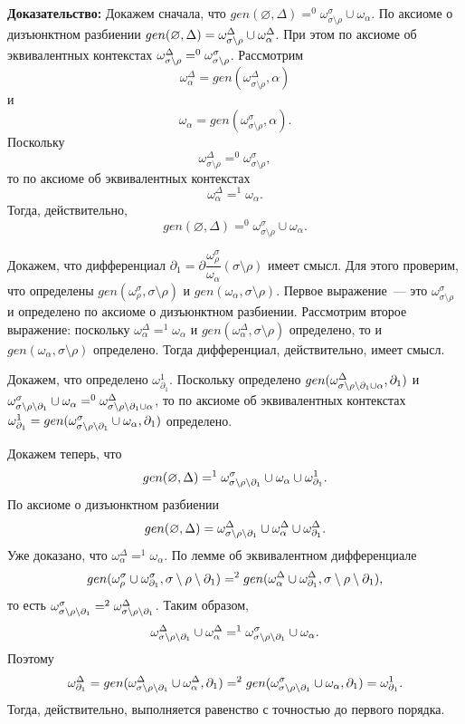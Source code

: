 \textbf{Доказательство:}
Докажем сначала, что $gen(\varnothing, \Delta) =^0 \omega^\sigma_{\sigma\setminus\rho} \cup \omega_\alpha$. По аксиоме о дизъюнктном разбиении $gen(\varnothing, \Delta) = \omega^\Delta_{\sigma\setminus\rho} \cup \omega^\Delta_\alpha$. При этом по аксиоме об эквивалентных контекстах $\omega^\Delta_{\sigma\setminus\rho} =^0 \omega^\sigma_{\sigma\setminus\rho}$. Рассмотрим $$\omega^\Delta_\alpha = gen(\omega^\Delta_{\sigma\setminus\rho}, \alpha)$$ 
и $$\omega_\alpha = gen(\omega^\sigma_{\sigma\setminus\rho}, \alpha).$$ 
Поскольку $$\omega^\Delta_{\sigma\setminus\rho} =^0 \omega^\sigma_{\sigma\setminus\rho},$$ 
то по аксиоме об эквивалентных контекстах $$\omega^\Delta_\alpha =^1 \omega_\alpha.$$ Тогда, действительно, $$gen(\varnothing, \Delta) =^0 \omega^\sigma_{\sigma\setminus\rho} \cup \omega_\alpha.$$ 

Докажем, что дифференциал $\partial_1 = \partial\dfrac{\omega^\sigma_\rho}{\omega_\alpha}(\sigma\setminus\rho)$ имеет смысл. Для этого проверим, что определены $gen(\omega^\sigma_\rho, \sigma\setminus\rho)$ и $gen(\omega_\alpha, \sigma\setminus\rho)$. Первое выражение~--- это $\omega^\sigma_{\sigma\setminus\rho}$ и определено по аксиоме о дизъюнктном разбиении. Рассмотрим второе выражение: поскольку $\omega^\Delta_\alpha =^1 \omega_\alpha$ и $gen(\omega^\Delta_\alpha, \sigma\setminus\rho)$ определено, то и $gen(\omega_\alpha, \sigma\setminus\rho)$ определено. Тогда дифференциал, действительно, имеет смысл.

Докажем, что определено $\omega^1_{\partial_1}$. Поскольку определено $gen(\omega^\Delta_{{\sigma\setminus\rho\setminus\partial_1} \cup \alpha}, \partial_1)$ и $\omega^\sigma_{{\sigma\setminus\rho\setminus\partial_1}} \cup \omega_\alpha =^0 \omega^\Delta_{{\sigma\setminus\rho\setminus\partial_1} \cup \alpha}$, то по аксиоме об эквивалентных контекстах $\omega^1_{\partial_1} = gen(\omega^\sigma_{{\sigma\setminus\rho\setminus\partial_1}} \cup \omega_\alpha, \partial_1)$ определено.

Докажем теперь, что $$gen(\varnothing, \Delta) =^1 \omega^\sigma_{{\sigma\setminus\rho\setminus\partial_1}} \cup \omega_\alpha \cup \omega^1_{\partial_1}.$$ 
По аксиоме о дизъюнктном разбиении $$gen(\varnothing, \Delta) = \omega^\Delta_{\sigma\setminus\rho\setminus\partial_1} \cup \omega^\Delta_\alpha \cup \omega^\Delta_{\partial_1}.$$ 
Уже доказано, что $\omega^\Delta_\alpha =^1 \omega_\alpha$. По лемме об эквивалентном дифференциале $$gen(\omega^\sigma_\rho \cup \omega^\sigma_{\partial_1}, {\sigma\setminus\rho\setminus\partial_1}) =^2 gen(\omega^\Delta_\alpha \cup \omega^\Delta_{\partial_1}, {\sigma\setminus\rho\setminus\partial_1}),$$ 
то есть $\omega^\sigma_{{\sigma\setminus\rho\setminus\partial_1}} =^2 \omega^\Delta_{{\sigma\setminus\rho\setminus\partial_1}}$. Таким образом, $$\omega^\Delta_{\sigma\setminus\rho\setminus\partial_1} \cup \omega^\Delta_\alpha =^1 \omega^\sigma_{{\sigma\setminus\rho\setminus\partial_1}} \cup \omega_\alpha.$$ 
Поэтому $$\omega^\Delta_{\partial_1} = gen(\omega^\Delta_{\sigma\setminus\rho\setminus\partial_1} \cup \omega^\Delta_\alpha, \partial_1) =^2 gen(\omega^\sigma_{{\sigma\setminus\rho\setminus\partial_1}} \cup \omega_\alpha, \partial_1) = \omega^1_{\partial_1}.$$ Тогда, действительно, выполняется равенство с точностью до первого порядка.


